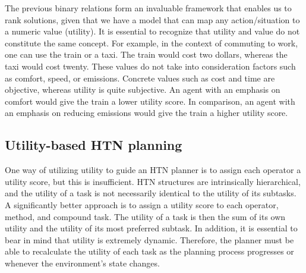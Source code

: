The previous binary relations form an invaluable framework that enables us to rank solutions, given that we have a model that can map any action/situation to a numeric value (utility). It is essential to recognize that utility and value do not constitute the same concept. For example, in the context of commuting to work, one can use the train or a taxi. The train would cost two dollars, whereas the taxi would cost twenty. These values do not take into consideration factors such as comfort, speed, or emissions. Concrete values such as cost and time are objective, whereas utility is quite subjective. An agent with an emphasis on comfort would give the train a lower utility score. In comparison, an agent with an emphasis on reducing emissions would give the train a higher utility score.


\subsection{Utility-based HTN planning}
One way of utilizing utility to guide an HTN planner is to assign each operator a utility score, but this is insufficient. HTN structures are intrinsically hierarchical, and the utility of a task is not necessarily identical to the utility of its subtasks. A significantly better approach is to assign a utility score to each operator, method, and compound task. The utility of a task is then the sum of its own utility and the utility of its most preferred subtask. In addition, it is essential to bear in mind that utility is extremely dynamic. Therefore, the planner must be able to recalculate the utility of each task as the planning process progresses or whenever the environment's state changes.

